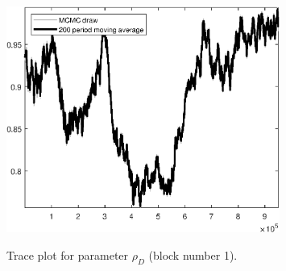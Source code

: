 \begin{figure}[H]
\centering
  \includegraphics[width=0.8\textwidth]{BRS_growth_util_sectoral/graphs/TracePlot_rho_D_blck_1}\\
    \caption{Trace plot for parameter ${\rho_D}$ (block number 1).}
\end{figure}
